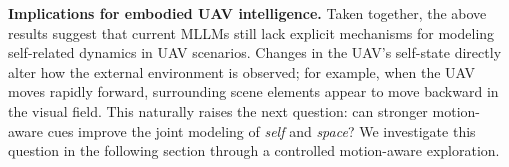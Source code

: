 \documentclass[sigconf, screen, review, anonymous]{acmart}
\newcommand{\choucisan}[1]{\textcolor{purple}{#1}}
\begin{document}


\noindent\textbf{Implications for embodied UAV intelligence.}
Taken together, the above results suggest that current MLLMs still lack explicit mechanisms for modeling self-related dynamics in UAV scenarios. Changes in the UAV's self-state directly alter how the external environment is observed; for example, when the UAV moves rapidly forward, surrounding scene elements appear to move backward in the visual field. This naturally raises the next question: can stronger motion-aware cues improve the joint modeling of \emph{self} and \emph{space}? We investigate this question in the following section through a controlled motion-aware exploration.
\end{document}
